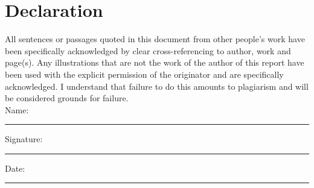 \documentclass[11pt,oneside]{book}
\begin{document}
\section*{\Large Declaration}

All sentences or passages quoted in this document from other people's work have been specifically acknowledged by clear cross-referencing to author, work and page(s).  Any illustrations that are not the work of the author of this report have been used with the explicit permission of the originator and are specifically acknowledged.  I understand that failure to do this amounts to plagiarism and will be considered grounds for failure.\\[1cm]

\noindent Name:\\[1mm]
\rule[1em]{25em}{0.5pt}

\noindent Signature:\\[1mm]
\rule[1em]{25em}{0.5pt}

\noindent Date:\\[1mm]
\rule[1em]{25em}{0.5pt}







\tableofcontents
\listoffigures
\listoftables



\mainmatter





%







 
% 
 



%
%
\end{document}
